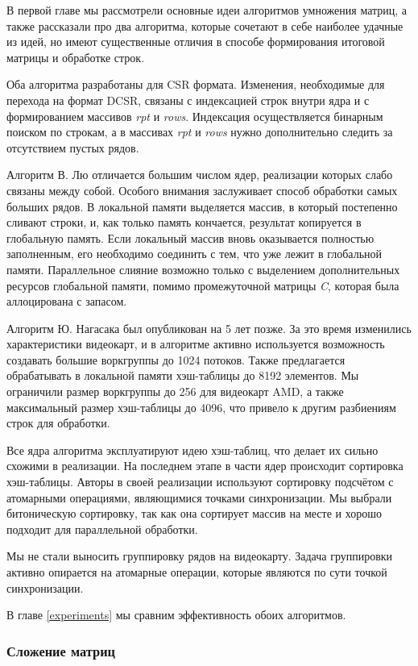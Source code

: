 \documentclass[14pt]{extarticle}
\newcommand{\txt}{\textit}
\begin{document}
	В первой главе мы рассмотрели основные идеи алгоритмов умножения матриц, а также рассказали про два алгоритма, которые сочетают в себе наиболее удачные из идей, но имеют существенные отличия в способе формирования итоговой матрицы и обработке строк.
	
	Оба алгоритма разработаны для CSR формата. Изменения, необходимые для перехода на формат DCSR, связаны с индексацией строк внутри ядра и с формированием массивов \txt{rpt} и \txt{rows}. Индексация осуществляется бинарным поиском по строкам, а в массивах \txt{rpt} и \txt{rows} нужно дополнительно следить за отсутствием пустых рядов.
	
	Алгоритм В. Лю отличается большим числом ядер, реализации которых слабо связаны между собой. Особого внимания заслуживает способ обработки самых больших рядов. В локальной памяти выделяется массив, в который постепенно сливают строки, и, как только память кончается, результат копируется в глобальную память. Если локальный массив вновь оказывается полностью заполненным, его необходимо соединить с тем, что уже лежит в глобальной памяти. Параллельное слияние возможно только с выделением дополнительных ресурсов глобальной памяти, помимо промежуточной матрицы \~{\txt{C}}, которая была аллоцирована с запасом.  
	
	Алгоритм Ю. Нагасака был опубликован на 5 лет позже. За это время изменились характеристики видеокарт, и в алгоритме активно используется возможность создавать большие воркгруппы до 1024 потоков. Также предлагается обрабатывать в локальной памяти хэш-таблицы до 8192 элементов. Мы ограничили размер воркгруппы до 256 для видеокарт AMD, а также максимальный размер хэш-таблицы до 4096, что привело к другим разбиениям строк для обработки.
	 
	Все ядра алгоритма эксплуатируют идею хэш-таблиц, что делает их сильно схожими в реализации. На последнем этапе в части ядер происходит сортировка хэш-таблицы. Авторы в своей реализации используют сортировку подсчётом с атомарными операциями, являющимися точками синхронизации. Мы выбрали битоническую сортировку, так как она сортирует массив на месте и хорошо подходит для параллельной обработки. 
	
	Мы не стали выносить группировку рядов на видеокарту. Задача группировки активно опирается на атомарные операции, которые являются по сути точкой синхронизации.  
	 
	В главе \ref{experiments} мы сравним эффективность обоих алгоритмов. 
	 
	\subsubsection{Сложение матриц}\label{section:add}
	
\end{document}
